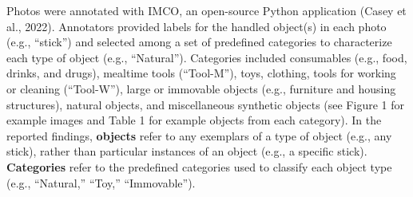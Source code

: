 \documentclass[10pt, letterpaper]{article}
\begin{document}
Photos were annotated with IMCO, an open-source Python application
(Casey et al., 2022). Annotators provided labels for the handled
object(s) in each photo (e.g., ``stick'') and selected among a set of
predefined categories to characterize each type of object (e.g.,
``Natural''). Categories included consumables (e.g., food, drinks, and
drugs), mealtime tools (``Tool-M''), toys, clothing, tools for working
or cleaning (``Tool-W''), large or immovable objects (e.g., furniture
and housing structures), natural objects, and miscellaneous synthetic
objects (see Figure 1 for example images and Table 1 for example objects
from each category). In the reported findings, \textbf{objects} refer to
any exemplars of a type of object (e.g., any stick), rather than
particular instances of an object (e.g., a specific stick).
\textbf{Categories} refer to the predefined categories used to classify
each object type (e.g., ``Natural,'' ``Toy,'' ``Immovable'').

\begin{table}[!ht]

\caption{\label{tab:top-objects}Number of unique objects (N) and objects handled by the most children, for each category, across sites.}
\centering
{}
\end{table}
\end{document}
